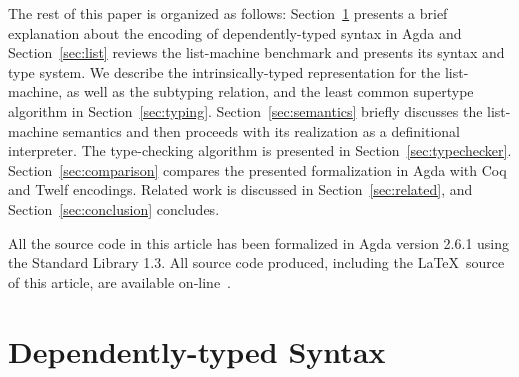 \documentclass[sigconf]{acmart}
\theoremstyle{definition}
\renewcommand{\geq}{\geqslant}
\begin{document}
The rest of this paper is organized as follows: Section~\ref{sec:agda}
presents a brief explanation about the encoding of dependently-typed syntax in Agda and Section~\ref{sec:list}
reviews the list-machine benchmark and presents its syntax and type system.
We describe the intrinsically-typed representation for the list-machine, as well as
the subtyping relation, and the least common supertype algorithm in Section~\ref{sec:typing}.
Section~\ref{sec:semantics} briefly discusses the list-machine semantics and
then proceeds with its realization as a definitional interpreter.
The type-checking algorithm is presented in Section~\ref{sec:typechecker}. Section~\ref{sec:comparison}
compares the presented formalization in Agda with Coq and Twelf encodings. Related work is
discussed in Section~\ref{sec:related}, and Section~\ref{sec:conclusion} concludes.

All the source code in this article has been formalized in Agda
version 2.6.1 using the Standard Library 1.3. All source code produced,
including the \LaTeX~source of this article, are available
on-line~\cite{list-rep}.





\section{Dependently-typed Syntax}\label{sec:agda}



\end{document}
